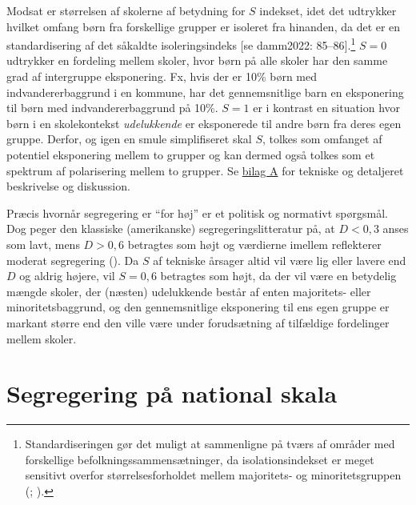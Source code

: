 \documentclass[
]{book}
\begin{document}
Modsat er størrelsen af skolerne af betydning for \(S\) indekset, idet det udtrykker hvilket omfang børn fra forskellige grupper er isoleret fra hinanden, da det er en standardisering af det såkaldte isoleringsindeks {[}se damm2022: 85--86{]}.\footnote{Standardiseringen gør det muligt at sammenligne på tværs af områder med forskellige befolkningssammensætninger, da isolationsindekset er meget sensitivt overfor størrelsesforholdet mellem majoritets- og minoritetsgruppen (; ).} \(S=0\) udtrykker en fordeling mellem skoler, hvor børn på alle skoler har den samme grad af intergruppe eksponering. Fx, hvis der er 10\% børn med indvandererbaggrund i en kommune, har det gennemsnitlige barn en eksponering til børn med indvandererbaggrund på 10\%. \(S=1\) er i kontrast en situation hvor børn i en skolekontekst \emph{udelukkende} er eksponerede til andre børn fra deres egen gruppe. Derfor, og igen en smule simplifiseret skal \(S\), tolkes som omfanget af potentiel eksponering mellem to grupper og kan dermed også tolkes som et spektrum af polarisering mellem to grupper. Se \hyperref[bilag1]{bilag A} for tekniske og detaljeret beskrivelse og diskussion.

Præcis hvornår segregering er ``for høj'' er et politisk og normativt spørgsmål. Dog peger den klassiske (amerikanske) segregeringslitteratur på, at \(D<0,3\) anses som lavt, mens \(D>0,6\) betragtes som højt og værdierne imellem reflekterer moderat segregering (). Da \(S\) af tekniske årsager altid vil være lig eller lavere end \(D\) og aldrig højere, vil \(S=0,6\) betragtes som højt, da der vil være en betydelig mængde skoler, der (næsten) udelukkende består af enten majoritets- eller minoritetsbaggrund, og den gennemsnitlige eksponering til ens egen gruppe er markant større end den ville være under forudsætning af tilfældige fordelinger mellem skoler.

\section{Segregering på national skala}\label{segregering-puxe5-national-skala}
\end{document}
